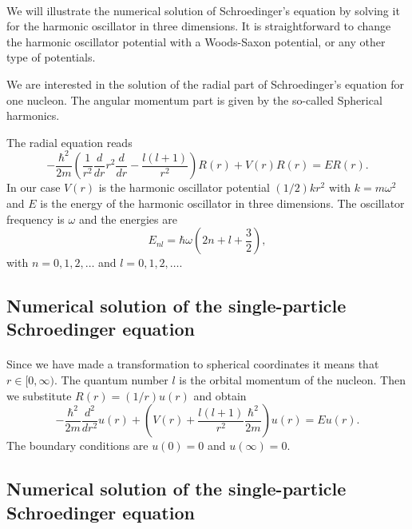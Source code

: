 \documentclass[%
twoside,                 %
final,                   %
10pt]{article}
\begin{document}
\paragraph{}
We will illustrate the numerical solution of Schroedinger's equation by solving it for the harmonic oscillator in three dimensions.
It is straightforward to change the harmonic oscillator potential with a Woods-Saxon potential, or any other type of potentials. 

We are interested in the solution of the radial part of Schroedinger's equation for one nucleon. 
The angular momentum part  is given by the so-called Spherical harmonics. 

The radial equation reads
\[
  -\frac{\hbar^2}{2 m} \left ( \frac{1}{r^2} \frac{d}{dr} r^2
  \frac{d}{dr} - \frac{l (l + 1)}{r^2} \right )R(r) 
     + V(r) R(r) = E R(r).
\]
In our case $V(r)$ is the harmonic oscillator potential $(1/2)kr^2$ with
$k=m\omega^2$ and $E$ is
the energy of the harmonic oscillator in three dimensions.
The oscillator frequency is $\omega$ and the energies are
\[
E_{nl}=  \hbar \omega \left(2n+l+\frac{3}{2}\right),
\]
with $n=0,1,2,\dots$ and $l=0,1,2,\dots$.




\subsection*{Numerical solution of the single-particle Schroedinger equation}

\paragraph{}
Since we have made a transformation to spherical coordinates it means that 
$r\in [0,\infty)$.  
The quantum number
$l$ is the orbital momentum of the nucleon.   Then we substitute $R(r) = (1/r) u(r)$ and obtain
\[
  -\frac{\hbar^2}{2 m} \frac{d^2}{dr^2} u(r) 
       + \left ( V(r) + \frac{l (l + 1)}{r^2}\frac{\hbar^2}{2 m}
                                    \right ) u(r)  = E u(r) .
\]
The boundary conditions are $u(0)=0$ and $u(\infty)=0$.




\subsection*{Numerical solution of the single-particle Schroedinger equation}
\end{document}
